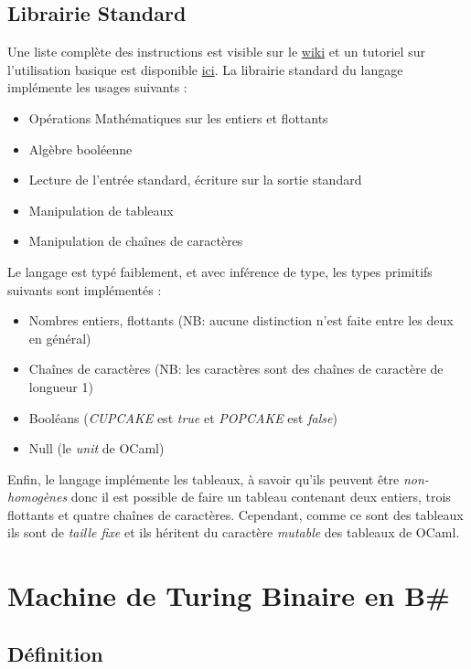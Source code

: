 \documentclass[11pt,colorlinks=true,a4paper]{article}
\newcommand{\bs}{B\# }
\begin{document}
    \subsection{Librairie Standard}
    Une liste complète des instructions est visible sur le \href{https://github.com/coco33920/ocaml-baguettesharp-interpreter/wiki}{wiki}
    et un tutoriel sur l'utilisation basique est disponible \href{https://www.baguettesharp.fr/basic.html}{ici}. La librairie 
    standard du langage implémente les usages suivants :
    \begin{itemize}
        \item Opérations Mathématiques sur les entiers et flottants 
        \item Algèbre booléenne
        \item Lecture de l'entrée standard, écriture sur la sortie standard
        \item Manipulation de tableaux 
        \item Manipulation de chaînes de caractères
    \end{itemize}
    \bigskip


    Le langage est typé faiblement, et avec inférence de type, les types primitifs suivants sont implémentés :
    \begin{itemize}
        \item Nombres entiers, flottants (NB: aucune distinction n'est faite entre les deux en général)
        \item Chaînes de caractères (NB: les caractères sont des chaînes de caractère de longueur 1)
        \item Booléans (\textit{CUPCAKE} est \textit{true} et \textit{POPCAKE} est \textit{false})
        \item Null (le \textit{unit} de OCaml)
    \end{itemize}
    \bigskip 

    Enfin, le langage implémente les tableaux, à savoir qu'ils peuvent être \textit{non-homogènes}
    donc il est possible de faire un tableau contenant deux entiers, trois flottants et quatre chaînes de caractères.
    Cependant, comme ce sont des tableaux ils sont de \textit{taille fixe} et ils héritent du caractère \textit{mutable}
    des tableaux de OCaml.

    \section{Machine de Turing Binaire en \bs}
    \subsection{Définition}
\end{document}
